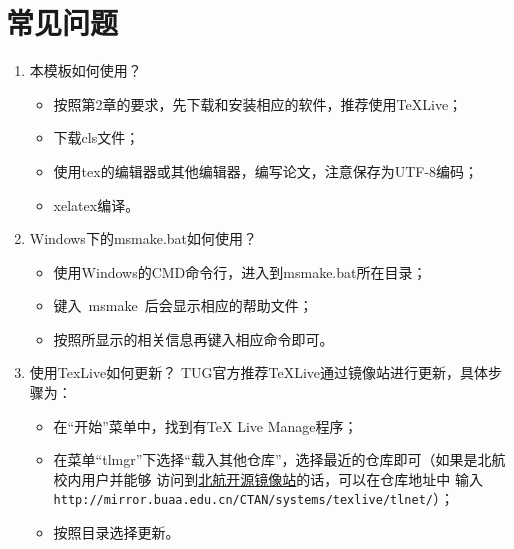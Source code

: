\chapter{常见问题}
\label{chapter-faq}
\begin{enumerate}
\item 本模板如何使用？
\label{faq-howtouse}
\begin{itemize}
    \item 按照第2章的要求，先下载和安装相应的软件，推荐使用\TeX{}Live；
    \item 下载cls文件；
    \item 使用tex的编辑器或其他编辑器，编写论文，注意保存为UTF-8编码；
    \item xelatex编译。
\end{itemize}
\item Windows下的msmake.bat如何使用？
\label{faq-msmake}
\begin{itemize}
    \item 使用Windows的CMD命令行，进入到msmake.bat所在目录；
    \item 键入~msmake~后会显示相应的帮助文件；
    \item 按照所显示的相关信息再键入相应命令即可。
\end{itemize}
\item 使用TexLive如何更新？
\label{faq-texliveupdate}
TUG官方推荐\TeX{}Live通过镜像站进行更新，具体步骤为：
\begin{itemize}
    \item 在“开始”菜单中，找到有TeX Live Manage程序；
    \item 在菜单“tlmgr”下选择“载入其他仓库”，选择最近的仓库即可（如果是北航校内用户并能够
    访问到\href{http://mirror.buaa.edu.cn/}{北航开源镜像站}的话，可以在仓库地址中
    输入\texttt{http://mirror.buaa.edu.cn/CTAN/systems/texlive/tlnet/}）；
    \item 按照目录选择更新。
\end{itemize}
\end{enumerate}
